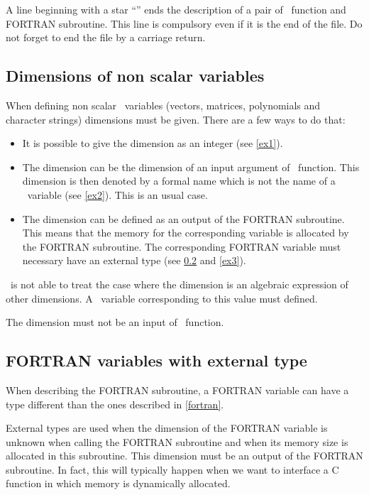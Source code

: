 A line beginning with a star ``\T{*}'' ends the description of a pair of
\SCI\ function and FORTRAN subroutine. This line is compulsory even if it is
the end of the file. Do not forget to end the file by a carriage return.

\subsection{Dimensions of non scalar variables}
\label{dimensions}

When defining non scalar \SCI\ variables (vectors, matrices, polynomials and
character strings) dimensions must be given. There are a few ways to do that:

\begin{itemize}
  \item It is possible to give the dimension as an integer (see \ref{ex1}).
  \item The dimension can be the dimension of an input argument of \SCI\
function. This dimension is then denoted by a formal name which is not the
name of a \SCI\ variable (see \ref{ex2}). This is an usual case.
  \item The dimension can be defined as an output of the FORTRAN subroutine.
This means that the memory for the corresponding variable is allocated by the
FORTRAN subroutine. The corresponding FORTRAN variable must necessary have an
external type (see \ref{external} and \ref{ex3}).
\end{itemize}

\ISCI\ is not able to treat the case where the dimension is an algebraic
expression of other dimensions. A \SCI\ variable corresponding to this value
must defined.

The dimension must not be an input of \SCI\ function.

\subsection{FORTRAN variables with external type}
\label{external}

When describing the FORTRAN subroutine, a FORTRAN variable can have a type
different than the ones described in \ref{fortran}.

External types are used when the dimension of the FORTRAN variable is
unknown when calling the FORTRAN subroutine and when its memory size is
allocated in this subroutine. This dimension must be an output of the FORTRAN
subroutine. In fact, this will typically happen when we want to interface a C
function in which memory is dynamically allocated.


